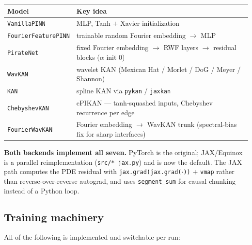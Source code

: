 \documentclass[11pt,a4paper]{article}
\begin{document}
\begin{center}
\small
\begin{tabular}{@{}l>{\raggedright\arraybackslash}p{10.2cm}@{}}
\toprule
\textbf{Model} & \textbf{Key idea}\\
\midrule
\texttt{VanillaPINN}        & MLP, Tanh $+$ Xavier initialization\\
\texttt{FourierFeaturePINN} & trainable random Fourier embedding $\to$ MLP\\
\texttt{PirateNet}          & fixed Fourier embedding $\to$ RWF layers $\to$ residual blocks ($\alpha$ init $0$)\\
\texttt{WavKAN}             & wavelet KAN (Mexican Hat / Morlet / DoG / Meyer / Shannon)\\
\texttt{KAN}                & spline KAN via \texttt{pykan} / \texttt{jaxkan}\\
\texttt{ChebyshevKAN}       & cPIKAN --- tanh-squashed inputs, Chebyshev recurrence per edge\\
\texttt{FourierWavKAN}      & Fourier embedding $\to$ WavKAN trunk (spectral-bias fix for sharp interfaces)\\
\bottomrule
\end{tabular}
\end{center}

\textbf{Both backends implement all seven.} PyTorch is the original; JAX/Equinox
is a parallel reimplementation (\texttt{src/*\_jax.py}) and is now the default.
The JAX path computes the PDE residual with
\texttt{jax.grad(jax.grad($\cdot$))} $+$ \texttt{vmap} rather than
reverse-over-reverse autograd, and uses \texttt{segment\_sum} for causal
chunking instead of a Python loop.

\subsection{Training machinery}

All of the following is implemented and switchable per run:
\end{document}
